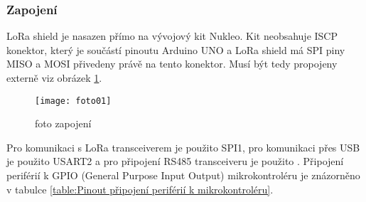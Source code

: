 



\subsubsection{Zapojení}
LoRa shield \cite{draginoWiki} je nasazen přímo na vývojový kit Nukleo. Kit neobsahuje ISCP konektor, který je součástí pinoutu Arduino UNO a LoRa shield má SPI piny MISO a MOSI přivedeny právě na tento konektor. Musí být tedy propojeny externě viz obrázek \ref{fig:03}. 

\begin{figure}[!h]
    \centering
    \texttt{[image: foto01]}
    \caption{foto zapojení}
    \label{fig:03}
\end{figure}

Pro komunikaci s LoRa transceiverem je použito SPI1, pro komunikaci přes USB je použito USART2 a pro připojení RS485 transceiveru je použito \DIFdelbegin {}\DIFdelend \DIFaddbegin {}\DIFaddend . 
Připojení periférií k GPIO (General Purpose Input Output) mikrokontroléru je znázorněno v tabulce \ref{table:Pinout připojení periférií k mikrokontroléru}.


